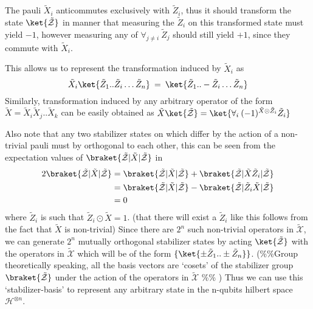 \documentclass[
]{article}
\begin{document}
The pauli \(\tilde{X}_i\) anticommutes exclusively with
\(\tilde{Z}_{i}\), thus it should transform the state
\(\ket{\mathcal{\tilde{Z}}}\) in manner that measuring the
\(\tilde{Z}_i\) on this transformed state must yield \(-1\), however
measuring any of \(\forall_{j \neq i} \:\tilde{Z}_{j}\) should still
yield \(+1\), since they commute with \(\tilde{X}_i\).

This allows us to represent the transformation induced by
\(\tilde{X}_{i}\) as
\[\tilde{X}_{i} \ket{\tilde{Z}_{1}.. \tilde{Z}_{i}\dots \tilde{Z}_{n}}  \: = \: \ket{\tilde{Z}_{1}.. -\tilde{Z}_{i}\dots \tilde{Z}_{n}}\]
Similarly, transformation induced by any arbitrary operator of the form
\(\tilde{X} = \tilde{X}_{i}\tilde{X}_{j} ..\tilde{X}_k\) can be easily
obtained as
\(\tilde{X} \ket{\tilde{\mathcal{Z}}} = \ket{ \forall_{i} \: (-1)^{\tilde{X} \odot \tilde{Z}_i}\tilde{Z}_{i}}\)

Also note that any two stabilizer states on which differ by the action
of a non-trivial pauli must by orthogonal to each other, this can be
seen from the expectation values of
\(\braket{\tilde{\mathcal{Z}}| \tilde{X}|\tilde{\mathcal{Z}}}\) in
\[\begin{align} 2\braket{\tilde{\mathcal{Z}}| \tilde{X}|\tilde{\mathcal{Z}}} &= \braket{\tilde{\mathcal{Z}}| \tilde{X}|\tilde{\mathcal{Z}}} +\braket{\tilde{\mathcal{Z}}| \tilde{X}\tilde{Z}_i|\tilde{\mathcal{Z}}} \\ &= \braket{\tilde{\mathcal{Z}}| \tilde{X}|\tilde{\mathcal{Z}}} -\braket{\tilde{\mathcal{Z}}| \tilde{Z}_i\tilde{X}|\tilde{\mathcal{Z}}} \\ &= 0\end{align}\]where
\(\tilde{Z}_i\) is such that \(\tilde{Z}_{i}\odot \tilde{X}=1\). (that
there will exist a \(\tilde{Z}_i\) like this follows from the fact that
\(\tilde{X}\) is non-trivial) Since there are \(2^{n}\) such non-trivial
operators in \(\tilde{\mathcal{X}}\), we can generate \(2^n\) mutually
orthogonal stabilizer states by acting \(\ket{\mathcal{\tilde{Z}}}\)
with the operators in \(\tilde{\mathcal{X}}\) which will be of the form
\(\{\ket{\pm \tilde{Z}_{1} ..\pm \tilde{Z}_{n}}\}\). (\%\%Group
theoretically speaking, all the basis vectors are `cosets' of the
stabilizer group \(\braket{\mathcal{\tilde{Z}}}\) under the action of
the operators in \(\mathcal{\tilde{X}}\) \%\% ) Thus we can use this
`stabilizer-basis' to represent any arbitrary state in the n-qubits
hilbert space \(\mathcal{H}^{\otimes n}\).
\end{document}
